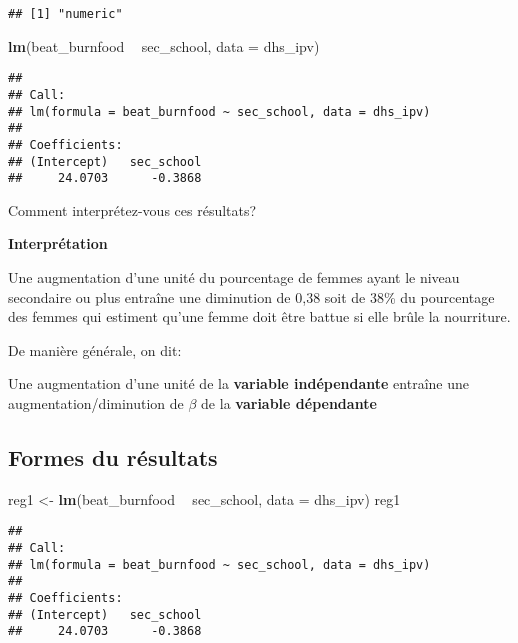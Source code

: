 \documentclass[
]{article}
\newenvironment{Shaded}{\begin{snugshade}}{\end{snugshade}}
\newcommand{\DataTypeTok}[1]{\textcolor[rgb]{0.13,0.29,0.53}{#1}}
\newcommand{\KeywordTok}[1]{\textcolor[rgb]{0.13,0.29,0.53}{\textbf{#1}}}
\newcommand{\NormalTok}[1]{#1}
\newcommand{\OperatorTok}[1]{\textcolor[rgb]{0.81,0.36,0.00}{\textbf{#1}}}
\newcommand{\StringTok}[1]{\textcolor[rgb]{0.31,0.60,0.02}{#1}}
\begin{document}
\begin{verbatim}
## [1] "numeric"
\end{verbatim}

\begin{Shaded}
\begin{Highlighting}[]
\KeywordTok{lm}\NormalTok{(beat_burnfood }\OperatorTok{~}\StringTok{ }\NormalTok{sec_school, }\DataTypeTok{data =}\NormalTok{ dhs_ipv)}
\end{Highlighting}
\end{Shaded}

\begin{verbatim}
## 
## Call:
## lm(formula = beat_burnfood ~ sec_school, data = dhs_ipv)
## 
## Coefficients:
## (Intercept)   sec_school  
##     24.0703      -0.3868
\end{verbatim}

Comment interprétez-vous ces résultats?

\textbf{Interprétation}

Une augmentation d'une unité du pourcentage de femmes ayant le niveau
secondaire ou plus entraîne une diminution de 0,38 soit de 38\% du
pourcentage des femmes qui estiment qu'une femme doit être battue si
elle brûle la nourriture.

De manière générale, on dit:

Une augmentation d'une unité de la \textbf{variable indépendante}
entraîne une augmentation/diminution de \(\beta\) de la \textbf{variable
dépendante}

\hypertarget{formes-du-ruxe9sultats}{%
\subsection{Formes du résultats}\label{formes-du-ruxe9sultats}}

\begin{Shaded}
\begin{Highlighting}[]
\NormalTok{reg1 <-}\StringTok{ }\KeywordTok{lm}\NormalTok{(beat_burnfood }\OperatorTok{~}\StringTok{ }\NormalTok{sec_school, }\DataTypeTok{data =}\NormalTok{ dhs_ipv)}
\NormalTok{reg1}
\end{Highlighting}
\end{Shaded}

\begin{verbatim}
## 
## Call:
## lm(formula = beat_burnfood ~ sec_school, data = dhs_ipv)
## 
## Coefficients:
## (Intercept)   sec_school  
##     24.0703      -0.3868
\end{verbatim}
\end{document}
